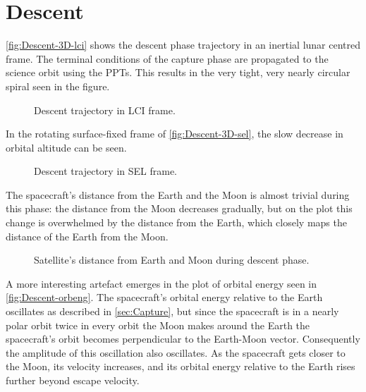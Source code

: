 
\clearpage


\section{Descent} \label{sec:Descent}

\autoref{fig:Descent-3D-lci} shows the descent phase trajectory in an inertial lunar centred frame. The terminal conditions of the capture phase are propagated to the science orbit using the PPTs. This results in the very tight, very nearly circular spiral seen in the figure.

\begin{figure}
\centering
\def\svgwidth{\figurewidth}

\caption{Descent trajectory in LCI frame.}
\label{fig:Descent-3D-lci}
\end{figure}

In the rotating surface-fixed frame of \autoref{fig:Descent-3D-sel}, the slow decrease in orbital altitude can be seen.

\begin{figure}
\centering
\def\svgwidth{\figurewidth}

\caption{Descent trajectory in SEL frame.}
\label{fig:Descent-3D-sel}
\end{figure}

The spacecraft's distance from the Earth and the Moon is almost trivial during this phase: the distance from the Moon decreases gradually, but on the plot this change is overwhelmed by the distance from the Earth, which closely maps the distance of the Earth from the Moon.

\begin{figure}
\centering
\def\svgwidth{\figurewidth}

\caption{Satellite's distance from Earth and Moon during descent phase.}
\label{fig:Descent-dist}
\end{figure}

A more interesting artefact emerges in the plot of orbital energy seen in \autoref{fig:Descent-orbeng}. The spacecraft's orbital energy relative to the Earth oscillates as described in \autoref{sec:Capture}, but since the spacecraft is in a nearly polar orbit twice in every orbit the Moon makes around the Earth the spacecraft's orbit becomes perpendicular to the Earth-Moon vector. Consequently the amplitude of this oscillation also oscillates. As the spacecraft gets closer to the Moon, its velocity increases, and its orbital energy relative to the Earth rises further beyond escape velocity.

